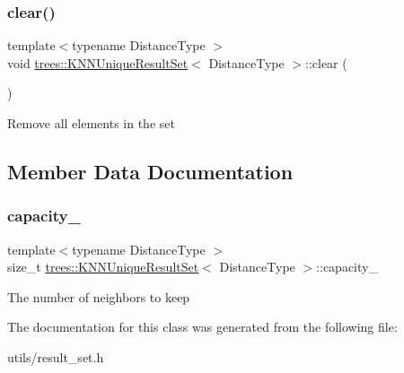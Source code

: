 \subsubsection{\texorpdfstring{clear()}{clear()}}
{\footnotesize\ttfamily template$<$typename Distance\+Type $>$ \\
void \hyperlink{classtrees_1_1_k_n_n_unique_result_set}{trees\+::\+K\+N\+N\+Unique\+Result\+Set}$<$ Distance\+Type $>$\+::clear (\begin{DoxyParamCaption}{ }\end{DoxyParamCaption})\hspace{0.3cm}{\ttfamily [inline]}}

Remove all elements in the set 

\subsection{Member Data Documentation}
\mbox{\label{classtrees_1_1_k_n_n_unique_result_set_a52a3e1ea392eeace263f540865a55250}} 
\subsubsection{\texorpdfstring{capacity\+\_\+}{capacity\_}}
{\footnotesize\ttfamily template$<$typename Distance\+Type $>$ \\
size\+\_\+t \hyperlink{classtrees_1_1_k_n_n_unique_result_set}{trees\+::\+K\+N\+N\+Unique\+Result\+Set}$<$ Distance\+Type $>$\+::capacity\+\_\+\hspace{0.3cm}{\ttfamily [protected]}}

The number of neighbors to keep 

The documentation for this class was generated from the following file\+:\begin{DoxyCompactItemize}
\item 
utils/result\+\_\+set.\+h\end{DoxyCompactItemize}
